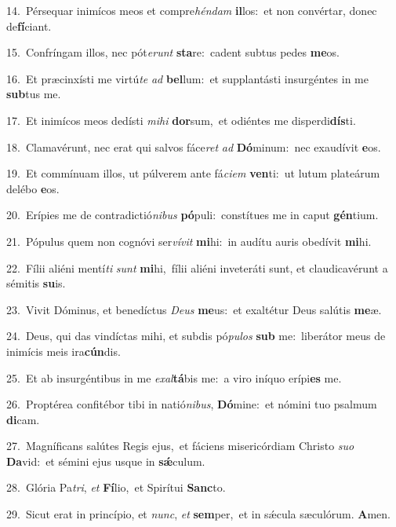 {\numbfont\textcolor{\numbcolor}{14.}}~Pérsequar inimícos meos et compre\-\textit{hén}\-\textit{dam} \textbf{il}\-los:~\star et non convértar, donec de\-\textbf{fí}\-ciant.\par
{\numbfont\textcolor{\numbcolor}{15.}}~Confríngam illos, nec pót\-\textit{e}\-\textit{runt} \textbf{sta}\-re:~\star cadent subtus pedes \textbf{me}\-os.\par
{\numbfont\textcolor{\numbcolor}{16.}}~Et præcinxísti me virtú\textit{te} \textit{ad} \textbf{bel}\-lum:~\star et supplantásti insurgéntes in me \textbf{sub}\-tus me.\par
{\numbfont\textcolor{\numbcolor}{17.}}~Et inimícos meos dedísti \textit{mi}\-\textit{hi} \textbf{dor}\-sum,~\star et odiéntes me disperdi\-\textbf{dís}\-ti.\par
{\numbfont\textcolor{\numbcolor}{18.}}~Clamavérunt, nec erat qui salvos fáce\textit{ret} \textit{ad} \textbf{Dó}\-minum:~\star nec exaudívit \textbf{e}\-os.\par
{\numbfont\textcolor{\numbcolor}{19.}}~Et commínuam illos, ut púlverem ante fá\-\textit{ci}\-\textit{em} \textbf{ven}\-ti:~\star ut lutum plateárum delébo \textbf{e}\-os.\par
{\numbfont\textcolor{\numbcolor}{20.}}~Erípies me de contradictió\-\textit{ni}\-\textit{bus} \textbf{pó}\-puli:~\star constítues me in caput \textbf{gén}\-tium.\par
{\numbfont\textcolor{\numbcolor}{21.}}~Pópulus quem non cognóvi ser\-\textit{ví}\-\textit{vit} \textbf{mi}\-hi:~\star in audítu auris obedívit \textbf{mi}\-hi.\par
{\numbfont\textcolor{\numbcolor}{22.}}~Fílii aliéni mentí\textit{ti} \textit{sunt} \textbf{mi}\-hi,~\star fílii aliéni inveteráti sunt, et claudicavérunt a sémitis \textbf{su}\-is.\par
{\numbfont\textcolor{\numbcolor}{23.}}~Vivit Dóminus, et benedíctus \textit{De}\-\textit{us} \textbf{me}\-us:~\star et exaltétur Deus salútis \textbf{me}\-æ.\par
{\numbfont\textcolor{\numbcolor}{24.}}~Deus, qui das vindíctas mihi, et subdis pó\-\textit{pu}\-\textit{los} \textbf{sub} me:~\star liberátor meus de inimícis meis ira\-\textbf{cún}\-dis.\par
{\numbfont\textcolor{\numbcolor}{25.}}~Et ab insurgéntibus in me \textit{ex}\-\textit{al}\textbf{tá}bis me:~\star a viro iníquo erípi\textbf{es} me.\par
{\numbfont\textcolor{\numbcolor}{26.}}~Proptérea confitébor tibi in natió\-\textit{ni}\-\textit{bus}, \textbf{Dó}\-mine:~\star et nómini tuo psalmum \textbf{di}\-cam.\par
{\numbfont\textcolor{\numbcolor}{27.}}~Magníficans salútes Regis ejus,~\dagger et fáciens misericórdiam Christo \textit{su}\-\textit{o} \textbf{Da}\-vid:~\star et sémini ejus usque in \textbf{sǽ}\-culum.\par
{\numbfont\textcolor{\numbcolor}{28.}}~Glória Pa\-\textit{tri}\-, \textit{et} \textbf{Fí}\-lio,~\star et Spirítui \textbf{Sanc}\-to.\par
{\numbfont\textcolor{\numbcolor}{29.}}~Sicut erat in princípio, et \textit{nunc}\-, \textit{et} \textbf{sem}\-per,~\star et in sǽcula sæculórum. \textbf{A}\-men.\par
